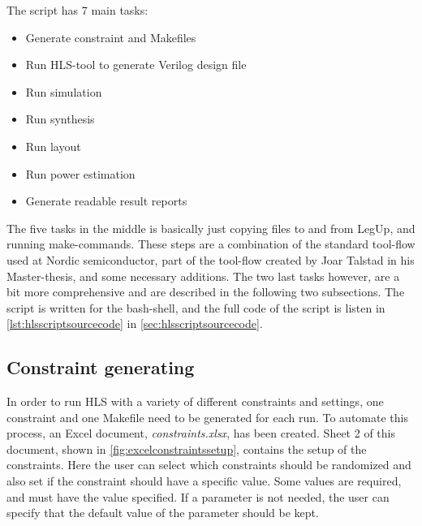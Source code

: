 The script has 7 main tasks:
\begin{itemize}
    \item Generate constraint and Makefiles
    \item Run HLS-tool to generate Verilog design file
    \item Run simulation
    \item Run synthesis
    \item Run layout
    \item Run power estimation
    \item Generate readable result reports
\end{itemize}
The five tasks in the middle is basically just copying files to and from LegUp, and running make-commands. These steps are a combination of the standard tool-flow used at Nordic semiconductor, part of the tool-flow created by Joar Talstad in his Master-thesis, and some necessary additions. The two last tasks however, are a bit more comprehensive and are described in the following two subsections. The script is written for the bash-shell, and the full code of the script is listen in \cref{lst:hlsscriptsourcecode} in \cref{sec:hlsscriptsourcecode}.

\subsection{Constraint generating}
In order to run HLS with a variety of different constraints and settings, one constraint and one Makefile need to be generated for each run. To automate this process, an Excel document, \textit{constraints.xlsx}, has been created. Sheet 2 of this document, shown in \cref{fig:excelconstraintssetup}, contains the setup of the constraints. Here the user can select which constraints should be randomized and also set if the constraint should have a specific value. Some values are required, and must have the value specified. If a parameter is not needed, the user can specify that the default value of the parameter should be kept. 

